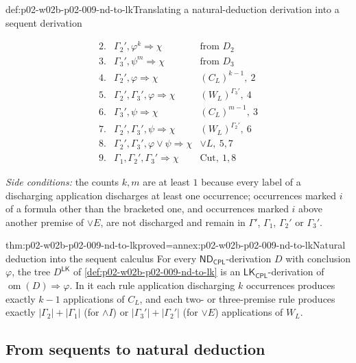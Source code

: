 \begin{hbmethod}{def:p02-w02b-p02-009-nd-to-lk}{Translating a natural-deduction derivation into a sequent derivation}
\begin{enumerate}
\[\begin{array}{rll}
    2.&\Gamma_2',\varphi^{k}\Rightarrow\chi&\text{from }D_2\\
    3.&\Gamma_3',\psi^{m}\Rightarrow\chi&\text{from }D_3\\
    4.&\Gamma_2',\varphi\Rightarrow\chi&(C_L)^{k-1},\ 2\\
    5.&\Gamma_2',\Gamma_3',\varphi\Rightarrow\chi&(W_L)^{\Gamma_3'},\ 4\\
    6.&\Gamma_3',\psi\Rightarrow\chi&(C_L)^{m-1},\ 3\\
    7.&\Gamma_2',\Gamma_3',\psi\Rightarrow\chi&(W_L)^{\Gamma_2'},\ 6\\
    8.&\Gamma_2',\Gamma_3',\varphi\lor\psi\Rightarrow\chi&\lor L,\ 5,7\\
    9.&\Gamma_1,\Gamma_2',\Gamma_3'\Rightarrow\chi&\mathrm{Cut},\ 1,8
    \end{array}
    \]
\end{enumerate}
\emph{Side conditions:} the counts \(k,m\) are at least \(1\) because every
label of a discharging application discharges at least one occurrence;
occurrences marked \(i\) of a formula other than the bracketed one, and
occurrences marked \(i\) above another premise of \(\lor E\), are not
discharged and remain in \(\Gamma'\), \(\Gamma_1\), \(\Gamma_2'\) or
\(\Gamma_3'\).
\end{hbmethod}

\begin{hbtheorem}{thm:p02-w02b-p02-009-nd-to-lk}{proved=annex:p02-w02b-p02-009-nd-to-lk}{Natural deduction into the sequent calculus}
For every \(\mathsf{ND}_{\mathsf{CPL}}\)-derivation \(D\) with conclusion
\(\varphi\), the tree \(D^{\mathsf{LK}}\) of
\cref{def:p02-w02b-p02-009-nd-to-lk} is an
\(\mathsf{LK}_{\mathsf{CPL}}\)-derivation of
\(\operatorname{om}(D)\Rightarrow\varphi\).  In it each rule application
discharging \(k\) occurrences produces exactly \(k-1\) applications of
\(C_L\), and each two- or three-premise rule produces exactly
\(|\Gamma_2|+|\Gamma_1|\) (for \(\land I\)) or
\(|\Gamma_3'|+|\Gamma_2'|\) (for \(\lor E\)) applications of \(W_L\).
\end{hbtheorem}

\subsection{From sequents to natural deduction}


